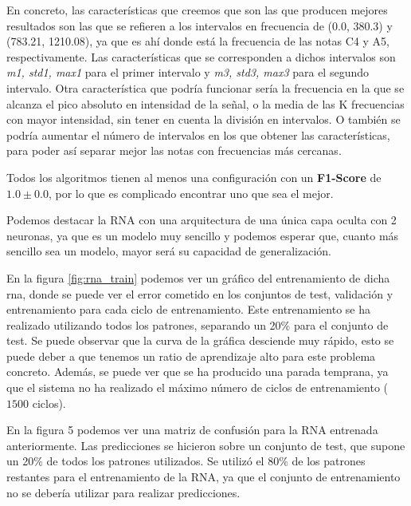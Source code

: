 \documentclass[12pt]{article}
\begin{document}
En concreto, las características que creemos que son las que producen mejores resultados son las que se refieren a los intervalos 
en frecuencia de (0.0, 380.3) y (783.21, 1210.08), ya que es ahí donde está la frecuencia de las notas C4 y A5, respectivamente.
Las características que se corresponden a dichos intervalos son \textit{m1, std1, max1} para el primer intervalo y \textit{m3, std3, max3}
para el segundo intervalo.
Otra característica que podría funcionar sería la frecuencia en la que se alcanza el pico absoluto en intensidad de la señal,
o la media de las K frecuencias con mayor intensidad, sin tener en cuenta la división en intervalos. O también se podría aumentar
el número de intervalos en los que obtener las características, para poder así separar mejor las notas con frecuencias más cercanas.

\bigskip
Todos los algoritmos tienen al menos una configuración con un \textbf{F1-Score} de $1.0 \pm 0.0$, por lo que es complicado encontrar uno que sea el mejor.

\bigskip
Podemos destacar la RNA con una arquitectura de una única capa oculta con 2 neuronas, ya que es un modelo muy sencillo y podemos esperar que, cuanto
más sencillo sea un modelo, mayor será su capacidad de generalización. 

\bigskip 
En la figura \ref{fig:rna_train} podemos ver un gráfico del entrenamiento de dicha rna, donde se puede ver el error
cometido en los conjuntos de test, validación y entrenamiento para cada ciclo de entrenamiento. Este entrenamiento se ha realizado
utilizando todos los patrones, separando un 20\% para el conjunto de test.
Se puede observar que la curva de la gráfica desciende muy rápido, esto se puede deber a que tenemos un ratio de aprendizaje
alto para este problema concreto. Además, se puede ver que se ha producido una parada temprana, ya que el sistema no ha realizado
el máximo número de ciclos de entrenamiento ($1500$ ciclos).

\bigskip
En la figura 5 podemos ver una matriz de confusión para la RNA entrenada anteriormente. Las predicciones se hicieron sobre un conjunto
de test, que supone un 20\% de todos los patrones utilizados. Se utilizó el 80\% de los patrones restantes para el entrenamiento de la RNA,
ya que el conjunto de entrenamiento no se debería utilizar para realizar predicciones.
\end{document}
